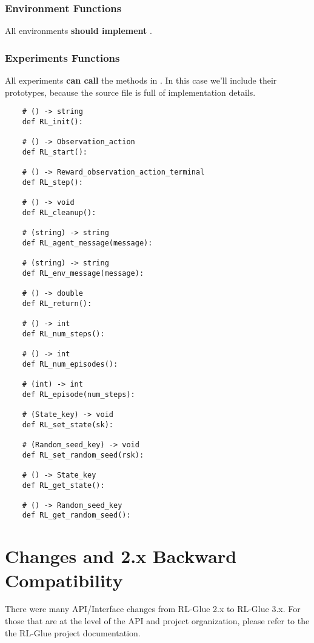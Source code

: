 \documentclass[11pt]{article}
\begin{document}
\subsubsection{Environment Functions}
All environments \textbf{should implement} .

\subsubsection{Experiments Functions}
All experiments \textbf{can call} the methods in .
In this case we'll include their prototypes, because the source file is full of implementation details.

\begin{verbatim}
	# () -> string
	def RL_init():

	# () -> Observation_action
	def RL_start():

	# () -> Reward_observation_action_terminal
	def RL_step():

	# () -> void
	def RL_cleanup():

	# (string) -> string
	def RL_agent_message(message):

	# (string) -> string
	def RL_env_message(message):

	# () -> double
	def RL_return():

	# () -> int
	def RL_num_steps():

	# () -> int
	def RL_num_episodes():

	# (int) -> int
	def RL_episode(num_steps):

	# (State_key) -> void
	def RL_set_state(sk):

	# (Random_seed_key) -> void
	def RL_set_random_seed(rsk):

	# () -> State_key
	def RL_get_state():

	# () -> Random_seed_key
	def RL_get_random_seed():
\end{verbatim}

\section{Changes and 2.x Backward Compatibility}
There were many API/Interface changes from RL-Glue 2.x to RL-Glue 3.x.  For those that are at the level of the API and project organization, please refer to the the RL-Glue 
project documentation.
\end{document}
